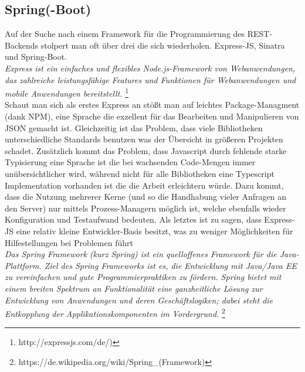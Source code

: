 \subsection{Spring(-Boot)}


Auf der Suche nach einem Framework für die Programmierung des REST-Backends stolpert man oft über drei die sich wiederholen. Express-JS, Sinatra und Spring-Boot. \\


\emph{\glqq   
Express ist ein einfaches und flexibles Node.js-Framework von Webanwendungen, das zahlreiche leistungsfähige Features und Funktionen für Webanwendungen und mobile Anwendungen bereitstellt.
\grqq} \footnote{http://expressjs.com/de/)} \\

Schaut man sich als erstes Express an stößt man auf leichtes Package-Managment (dank NPM), eine Sprache die exzellent für das Bearbeiten und Manipulieren von JSON gemacht ist. Gleichzeitig ist das Problem, dass viele Bibliotheken unterschiedliche Standards benutzen was der Übersicht in größeren Projekten schadet. Zusätzlich kommt das Problem, dass Javascript durch fehlende starke Typisierung eine Sprache ist die bei wachsenden Code-Mengen immer unübersichtlicher wird, während nicht für alle Bibliotheken eine Typescript Implementation vorhanden ist die die Arbeit erleichtern würde. Dazu kommt, dass die Nutzung mehrerer Kerne (und so die Handhabung vieler Anfragen an den Server) nur mittels Prozess-Managern möglich ist, welche ebenfalls wieder Konfiguration und Testaufwand bedeuten. Als letztes ist zu sagen, dass Express-JS eine relativ kleine Entwickler-Basis besitzt, was zu weniger Möglichkeiten für Hilfestellungen bei Problemen führt \\


\emph{\glqq   
Das Spring Framework (kurz Spring) ist ein quelloffenes Framework für die Java-Plattform. Ziel des Spring Frameworks ist es, die Entwicklung mit Java/Java EE zu vereinfachen und gute Programmierpraktiken zu fördern. Spring bietet mit einem breiten Spektrum an Funktionalität eine ganzheitliche Lösung zur Entwicklung von Anwendungen und deren Geschäftslogiken; dabei steht die Entkopplung der Applikationskomponenten im Vordergrund.
\grqq} \footnote{https://de.wikipedia.org/wiki/Spring\_(Framework)} \\

